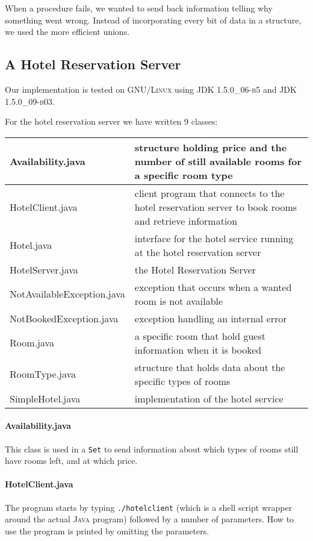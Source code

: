 \documentclass[a4paper,10pt]{article}
\begin{document}
When a procedure fails, we wanted to send back information telling why
something went wrong. Instead of incorporating every bit of data in a
structure, we used the more efficient unions.


\subsection{A Hotel Reservation Server}\label{sec:hotel}
Our implementation is tested on \textsc{GNU/Linux} using
\textsc{JDK 1.5.0\_06-b5} and \textsc{JDK 1.5.0\_09-b03}.

For the hotel reservation server we have written 9 classes:
\begin{center}
\begin{tabular}{ l | p{7.0cm} }
Availability.java & structure holding price and the number of still available rooms for a specific room type\\ \hline
HotelClient.java & client program that connects to the hotel reservation server to book rooms and retrieve information\\ \hline
Hotel.java & interface for the hotel service running at the hotel reservation server\\ \hline
HotelServer.java & the Hotel Reservation Server\\ \hline
NotAvailableException.java & exception that occurs when a wanted room is not available\\ \hline
NotBookedException.java & exception handling an internal error\\ \hline
Room.java & a specific room that hold guest information when it is booked\\ \hline
RoomType.java & structure that holds data about the specific types of rooms\\ \hline
SimpleHotel.java & implementation of the hotel service\\
\end{tabular}
\end{center}

\paragraph{Availability.java}
This class is used in a \texttt{Set} to send information about which types of
rooms still have rooms left, and at which price.

\paragraph{HotelClient.java}
The program starts by typing \texttt{./hotelclient} (which is a shell
script wrapper around the actual \textsc{Java} program) followed by a
number of parameters. How to use the program is printed by omitting
the parameters.
\end{document}
